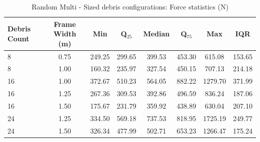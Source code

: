 \documentclass{article}
\begin{document}
\begin{table}[h!]
\centering
\caption{Random Multi - Sized debris configurations: Force statistics (N)}
\begin{tabular}{lccccccc}
\toprule
\textbf{Debris Count} & \textbf{Frame Width (m)} & \textbf{Min} & \textbf{Q$_{25}$} & \textbf{Median} & \textbf{Q$_{75}$} & \textbf{Max} & \textbf{IQR} \\
\midrule
8 & 0.75 & 249.25 & 299.65 & 399.53 & 453.30 & 615.08 & 153.65 \\
8 & 1.00 & 160.32 & 235.97 & 327.54 & 450.15 & 707.13 & 214.18 \\
16 & 1.00 & 372.67 & 510.23 & 564.05 & 882.22 & 1279.70 & 371.99 \\
16 & 1.25 & 267.36 & 309.53 & 392.86 & 496.59 & 836.24 & 187.06 \\
16 & 1.50 & 175.67 & 231.79 & 359.92 & 438.89 & 630.04 & 207.10 \\
24 & 1.25 & 334.50 & 569.18 & 737.53 & 818.95 & 1725.19 & 249.77 \\
24 & 1.50 & 326.34 & 477.99 & 502.71 & 653.23 & 1266.47 & 175.24 \\
\bottomrule
\end{tabular}
\end{table}
\end{document}
